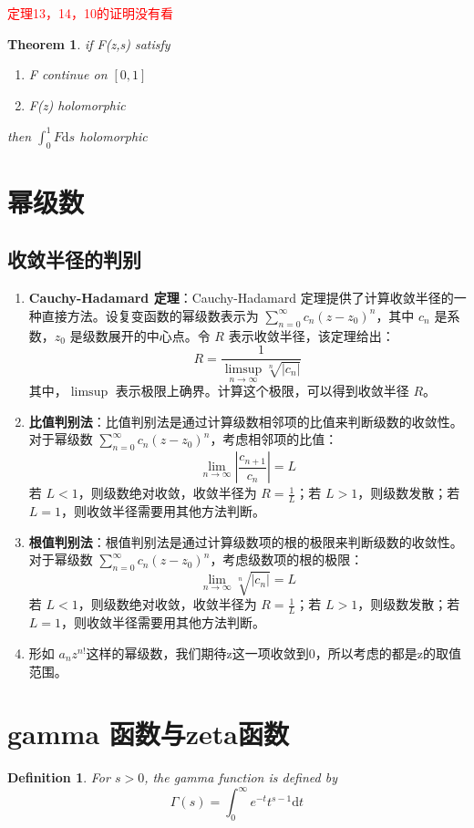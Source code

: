 \documentclass{article}
\newtheorem{theorem}{Theorem}
\newtheorem{definition}{Definition}
\begin{document}
\textcolor{red}{定理13，14，10的证明没有看}
\begin{theorem}
    if F(z,s) satisfy
    \begin{enumerate}
        \item F continue on $ \left[ 0,1 \right] $
        \item F(z) holomorphic
    \end{enumerate}
    then $ \int_{0}^{1} F \mathrm{d}s $ holomorphic
\end{theorem}

\newpage
\section{幂级数}
\subsection{收敛半径的判别}

\begin{enumerate}
    \item \textbf{Cauchy-Hadamard 定理}：Cauchy-Hadamard 定理提供了计算收敛半径的一种直接方法。设复变函数的幂级数表示为 $\sum_{n=0}^{\infty} c_n(z - z_0)^n$，其中 $c_n$ 是系数，$z_0$ 是级数展开的中心点。令 $R$ 表示收敛半径，该定理给出：
    \[R = \frac{1}{\limsup_{n \to \infty} \sqrt[n]{|c_n|}}\]
    其中，$\limsup$ 表示极限上确界。计算这个极限，可以得到收敛半径 $R$。
    \item \textbf{比值判别法}：比值判别法是通过计算级数相邻项的比值来判断级数的收敛性。对于幂级数 $\sum_{n=0}^{\infty} c_n(z - z_0)^n$，考虑相邻项的比值：
    \[\lim_{n \to \infty} \left|\frac{c_{n+1}}{c_n}\right| = L\]
    若 $L < 1$，则级数绝对收敛，收敛半径为 $R = \frac{1}{L}$；若 $L > 1$，则级数发散；若 $L = 1$，则收敛半径需要用其他方法判断。
    \item \textbf{根值判别法}：根值判别法是通过计算级数项的根的极限来判断级数的收敛性。对于幂级数 $\sum_{n=0}^{\infty} c_n(z - z_0)^n$，考虑级数项的根的极限：
    \[\lim_{n \to \infty} \sqrt[n]{|c_n|} = L\]
    若 $L < 1$，则级数绝对收敛，收敛半径为 $R = \frac{1}{L}$；若 $L > 1$，则级数发散；若 $L = 1$，则收敛半径需要用其他方法判断。
    \item 形如 $ a_nz^{n!} $这样的幂级数，我们期待z这一项收敛到0，所以考虑的都是z的取值范围。
\end{enumerate}




\newpage


\section{gamma 函数与zeta函数}
\begin{definition}
    For $ s>0 $, the gamma function is defined by 
    \[ \Gamma(s)=\int_{0}^{\infty}e^{-t}t^{s-1}\mathrm{d}t\]
\end{definition}
\end{document}
